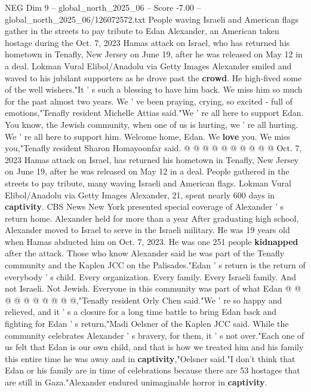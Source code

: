 \begin{textsample}{NEG Dim 9 – global\_north\_2025\_06 – Score -7.00 – global\_north\_2025\_06/126072572.txt}  \label{ex:f9_neg_098}
People waving Israeli and American flags gather in the streets to pay tribute to Edan Alexander, an American taken hostage during the Oct. 7, 2023 Hamas attack on Israel, who has returned his hometown in Tenafly, New Jersey on June 19, after he was released on May 12 in a deal.
Lokman Vural Elibol/Anadolu via Getty Images Alexander smiled and waved to his jubilant supporters as he drove past the \textbf{crowd}.
He high-fived some of the well wishers."It ' s such a blessing to have him back.
We miss him so much for the past almost two years.
We ' ve been praying, crying, so excited - full of emotions,"Tenafly resident Michelle Attias said."We ' re all here to support Edan.
You know, the Jewish community, when one of us is hurting, we ' re all hurting.
We ' re all here to support him.
Welcome home, Edan.
We \textbf{love} you.
We miss you,"Tenafly resident Sharon Homayoonfar said. @ @ @ @ @ @ @ @ @ @ Oct. 7, 2023 Hamas attack on Israel, has returned his hometown in Tenafly, New Jersey on June 19, after he was released on May 12 in a deal.
People gathered in the streets to pay tribute, many waving Israeli and American flags.
Lokman Vural Elibol/Anadolu via Getty Images Alexander, 21, spent nearly 600 days in \textbf{captivity}.
CBS News New York presented special coverage of Alexander ' s return home.
Alexander held for more than a year After graduating high school, Alexander moved to Israel to serve in the Israeli military.
He was 19 years old when Hamas abducted him on Oct. 7, 2023.
He was one 251 people \textbf{kidnapped} after the attack.
Those who know Alexander said he was part of the Tenafly community and the Kaplen JCC on the Palisades."Edan ' s return is the return of everybody ' s child.
Every organization.
Every family.
Every Israeli family.
And not Israeli.
Not Jewish.
Everyone in this community was part of what Edan @ @ @ @ @ @ @ @ @ @,"Tenafly resident Orly Chen said."We ' re so happy and relieved, and it ' s a closure for a long time battle to bring Edan back and fighting for Edan ' s return,"Madi Oelsner of the Kaplen JCC said.
While the community celebrates Alexander ' s bravery, for them, it ' s not over."Each one of us felt that Edan is our own child, and that is how we treated him and his family this entire time he was away and in \textbf{captivity},"Oelsner said."I don't think that Edan or his family are in time of celebrations because there are 53 hostages that are still in Gaza."Alexander endured unimaginable horror in \textbf{captivity}.

\end{textsample}

